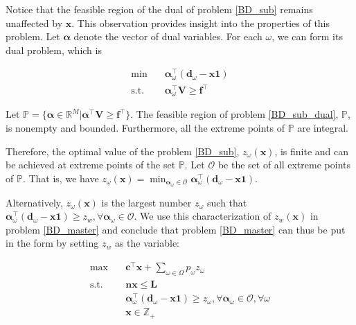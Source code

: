 Notice that the feasible region of the dual of problem \eqref{BD_sub} remains unaffected by $\mathbf{x}$. This observation provides insight into the properties of this problem. Let $\bm{\alpha}$ denote the vector of dual variables. For each $\omega$, we can form its dual problem, which is 

\begin{equation}\label{BD_sub_dual}
  \begin{aligned}
    \min \quad & \bm{\alpha}_{\omega}^{\intercal} (\mathbf{d}_{\omega}- \mathbf{x} \mathbf{1}) \\
    \text {s.t.} \quad & \bm{\alpha}_{\omega}^{\intercal} \mathbf{V} \geq \mathbf{f}^{\intercal}
  \end{aligned}
\end{equation}


\begin{lem}\label{feasible_region}
    Let $\mathbb{P} = \{\bm{\alpha} \in \mathbb{R}^{M}|\bm{\alpha}^{\intercal} \mathbf{V} \geq \mathbf{f}^{\intercal}\}$. The feasible region of problem \eqref{BD_sub_dual}, $\mathbb{P}$, is nonempty and bounded. Furthermore, all the extreme points of $\mathbb{P}$ are integral.
    \end{lem}

    
Therefore, the optimal value of the problem \eqref{BD_sub}, $z_{\omega}(\mathbf{x})$, is finite and can be achieved at extreme points of the set $\mathbb{P}$. Let $\mathcal{O}$ be the set of all extreme points of $\mathbb{P}$. That is, we have $z_{\omega}(\mathbf{x}) = \min_{\bm{\alpha}_{\omega} \in \mathcal{O}} \bm{\alpha}_{\omega}^{\intercal}(\mathbf{d}_{\omega}- \mathbf{x} \mathbf{1})$.


Alternatively, $z_{\omega}(\mathbf{x})$ is the largest number $z_{\omega}$ such that $\bm{\alpha}_{\omega}^{\intercal}(\mathbf{d}_{\omega}- \mathbf{x} \mathbf{1}) \geq z_w, \forall \bm{\alpha}_{\omega} \in \mathcal{O}$. We use this characterization of $z_w(\mathbf{x})$ in problem \eqref{BD_master} and conclude that problem \eqref{BD_master} can thus be put in the form by setting $z_w$ as the variable:

\begin{equation}\label{BD_master2}
  \begin{aligned}
    \max \quad & \mathbf{c}^{\intercal} \mathbf{x} + \sum_{\omega \in \Omega} p_{\omega} z_{\omega} \\
    \text {s.t.} \quad & \mathbf{n} \mathbf{x} \leq \mathbf{L} \\
    & \bm{\alpha}_{\omega}^{\intercal}(\mathbf{d}_{\omega}- \mathbf{x} \mathbf{1}) \geq z_{\omega}, \forall \bm{\alpha}_{\omega} \in \mathcal{O}, \forall \omega \\
     & \mathbf{x} \in \mathbb{Z}_{+}
  \end{aligned}
\end{equation}

